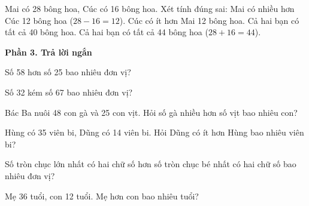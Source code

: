 \begin{ex} %
Mai có 28 bông hoa, Cúc có 16 bông hoa. Xét tính đúng sai:
\choiceTF
{\True Mai có nhiều hơn Cúc 12 bông hoa ($28 - 16 = 12$).}
{\True Cúc có ít hơn Mai 12 bông hoa.}
{Cả hai bạn có tất cả 40 bông hoa.}
{\True Cả hai bạn có tất cả 44 bông hoa ($28 + 16 = 44$).}
\end{ex}

\textbf{Phần 3. Trả lời ngắn}

\begin{ex} %
Số 58 hơn số 25 bao nhiêu đơn vị?
\end{ex}

\begin{ex} %
Số 32 kém số 67 bao nhiêu đơn vị?
\end{ex}

\begin{ex} %
Bác Ba nuôi 48 con gà và 25 con vịt. Hỏi số gà nhiều hơn số vịt bao nhiêu con?
\end{ex}

\begin{ex} %
Hùng có 35 viên bi, Dũng có 14 viên bi. Hỏi Dũng có ít hơn Hùng bao nhiêu viên bi?
\end{ex}

\begin{ex} %
Số tròn chục lớn nhất có hai chữ số hơn số tròn chục bé nhất có hai chữ số bao nhiêu đơn vị?
\end{ex}

\begin{ex} %
Mẹ 36 tuổi, con 12 tuổi. Mẹ hơn con bao nhiêu tuổi?
\end{ex}
